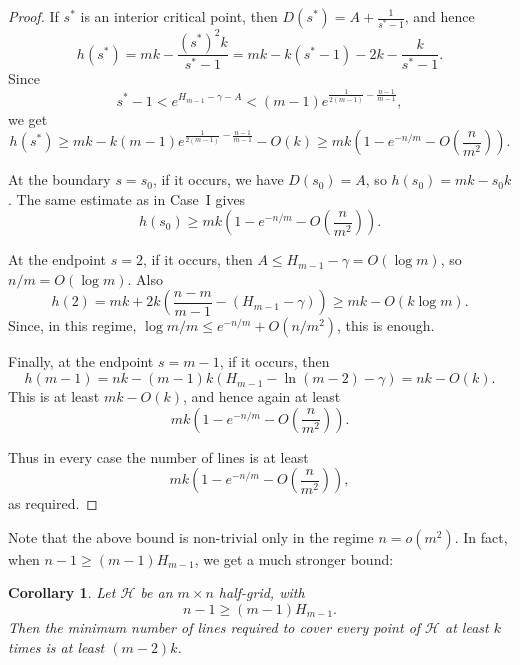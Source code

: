 \documentclass[usenames,dvipsnames, 11pt]{article}
\newtheorem{cor}[thm]{Corollary}
\numberwithin{thm}{section}
\theoremstyle{definition}
\theoremstyle{definition}
\theoremstyle{definition}
\newcommand{\1}{\mathbf{1}}
\def\cH{{\mathcal H}}
\begin{document}
\begin{proof}
    If $s^*$ is an interior critical point, then
    $D(s^*)=A+\frac{1}{s^*-1}$, and hence
    \[
    h(s^*)=
    mk-\frac{(s^*)^2k}{s^*-1}
    =
    mk-k(s^*-1)-2k-\frac{k}{s^*-1}.
    \]
    Since
    \[
    s^*-1<e^{H_{m-1}-\gamma-A}
    <
    (m-1)e^{\frac{1}{2(m-1)}-\frac{n-1}{m-1}},
    \]
    we get
    \[
    h(s^*)\geq
    mk-k(m-1)e^{\frac{1}{2(m-1)}-\frac{n-1}{m-1}}-O(k)
    \geq
    mk\left(1-e^{-n/m}-O\left(\frac{n}{m^2}\right)\right).
    \]

    At the boundary $s=s_0$, if it occurs, we have $D(s_0)=A$, so
    $h(s_0)=mk-s_0k$. The same estimate as in Case~I gives
    \[
    h(s_0)\geq
    mk\left(1-e^{-n/m}-O\left(\frac{n}{m^2}\right)\right).
    \]

    At the endpoint $s=2$, if it occurs, then
    $A\leq H_{m-1}-\gamma=O(\log m)$, so $n/m=O(\log m)$. Also
    \[
    h(2)=
    mk+
    2k\left(\frac{n-m}{m-1}-(H_{m-1}-\gamma)\right)
    \geq
    mk-O(k\log m).
    \]
    Since, in this regime,
    $\log m/m\leq e^{-n/m}+O(n/m^2)$, this is enough.

    Finally, at the endpoint $s=m-1$, if it occurs, then
    \[
    h(m-1)
    =
    nk-(m-1)k\left(H_{m-1}-\ln(m-2)-\gamma\right)
    =
    nk-O(k).
    \]
    This is at least $mk-O(k)$, and hence again at least
    \[
    mk\left(1-e^{-n/m}-O\left(\frac{n}{m^2}\right)\right).
    \]

    Thus in every case the number of lines is at least
    \[
    mk\left(1-e^{-n/m}-O\left(\frac{n}{m^2}\right)\right),
    \]
    as required.
\end{proof}

Note that the above bound is non-trivial only in the regime $n=o(m^2)$. In fact, when $n-1\geq (m-1)H_{m-1}$, we get a much stronger bound:

\begin{cor}
    Let $\cH$ be an $m \times n$ half-grid, with
    \[
    n-1 \geq (m-1)H_{m-1}.
    \]
    Then the minimum number of lines required to cover every point of $\cH$
    at least $k$ times is at least $(m-2)k$.
\end{cor}
\end{document}
